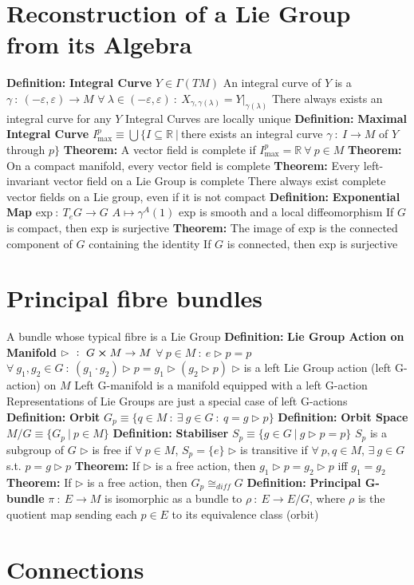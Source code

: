 \documentclass[14pt]{extarticle}
\def\Definition{{\color{blue} \textbf{Definition:} }}
\def\Theorem{{\color{red} \textbf{Theorem:} }}
\begin{document}
\begin{outline}
	\section*{Reconstruction of a Lie Group from its Algebra}
		\1	\Definition \textbf{Integral Curve}
			\2	$Y \in \Gamma(TM)$
			\2	An integral curve of $Y$ is a $\gamma~:~(-\varepsilon,\varepsilon) \rightarrow M$
			\2	$\forall~\lambda \in (-\varepsilon,\varepsilon)~:~X_{\gamma,\gamma(\lambda)} = Y|_{\gamma(\lambda)}$
			\2	There always exists an integral curve for any $Y$
			\2	Integral Curves are locally unique
		\1	\Definition \textbf{Maximal Integral Curve}
			\2	$I^p_{\text{max}} \equiv \bigcup\{I \subseteq \mathbb{R}~|~$there 
					exists an integral curve $\gamma~:~I \rightarrow M$ of $Y$ through $p\}$
		\1	\Theorem A vector field is complete if $I_{\text{max}}^p = \mathbb{R}~\forall~p \in M$
		\1	\Theorem On a compact manifold, every vector field is complete
		\1	\Theorem Every left-invariant vector field on a Lie Group is complete
			\2	There always exist complete vector fields on a Lie group, even if 
					it is not compact
		\1	\Definition \textbf{Exponential Map}
			\2	$\text{exp}~:~T_eG \rightarrow G$
			\2	$A \mapsto \gamma^A(1)$
			\2	exp is smooth and a local diffeomorphism
			\2	If $G$ is compact, then exp is surjective
		\1	\Theorem The image of exp is the connected component
				of $G$ containing the identity
			\2	If $G$ is connected, then exp is surjective
	
	\section*{Principal fibre bundles}
		\1	A bundle whose typical fibre is a Lie Group
		\1	\Definition \textbf{Lie Group Action on Manifold}
			\2	$\rhd~:~G \cross M \rightarrow M$
			\2	$\forall~p \in M~:~e \rhd p = p$
			\2	$\forall~g_1,g_2 \in G~:~(g_1 \cdot g_2) \rhd p = g_1 \rhd (g_2 \rhd p)$
			\2	$\rhd$ is a left Lie Group action (left G-action) on $M$
			\2	Left G-manifold is a manifold equipped with a left G-action
			\2	Representations of Lie Groups are just a special case of left G-actions
		\1	\Definition \textbf{Orbit}
			\2	$G_p \equiv \{q \in M~:~\exists~g \in G~:~q = g \rhd p\}$
			\2	\Definition \textbf{Orbit Space}
				\2	$M/G \equiv \{G_p~|~p \in M\}$
		\1	\Definition \textbf{Stabiliser}
			\2	$S_p \equiv \{g \in G~|~g \rhd p = p\}$
			\2	$S_p$ is a subgroup of $G$
			\2	$\rhd$ is free if $\forall~p \in M$, $S_p = \{e\}$
			\2	$\rhd$ is transitive if $\forall~p,q \in M$, $\exists~g \in G$ s.t. 
					$p = g \rhd p$
			\2	\Theorem If $\rhd$ is a free action, then $g_1 \rhd p = g_2 \rhd p$ iff
					$g_1 = g_2$
			\2	\Theorem If $\rhd$ is a free action, then $G_p \cong_{diff} G$
		\1	\Definition \textbf{Principal G-bundle}
			\2	$\pi~:~E \rightarrow M$ is isomorphic as a bundle to 
					$\rho~:~E \rightarrow E/G$, where $\rho$ is the quotient map
					sending each $p \in E$ to its equivalence class (orbit)
	
	\section*{Connections}

	\end{outline}
\end{document}
